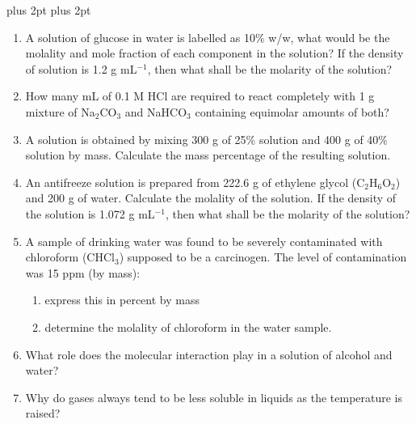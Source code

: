 \documentclass[11pt,a4paper]{article}
\renewcommand{\normalsize}{\fontsize{10.5bp}{12.7bp}\selectfont\abovedisplayskip=4pt plus 2pt\belowdisplayskip=4pt plus 2pt\abovedisplayshortskip=2pt\belowdisplayshortskip=2pt}
\begin{document}
\normalsize


\noindent\hfill\begin{minipage}[t]{0.85\textwidth}
\begin{tcolorbox}[enhanced,frame hidden,colback=white,left=26pt,right=0pt,top=0pt,bottom=8pt,boxsep=0pt,arc=0pt,overlay={\fill[salmon,rounded corners=2pt] (frame.south west) rectangle ([xshift=10pt]frame.north west);}]
\begin{enumerate}[label=\textbf{1.\arabic*},leftmargin=38pt,itemsep=3pt,topsep=0pt,start=5]
\item A solution of glucose in water is labelled as 10\% w/w, what would be the molality and mole fraction of each component in the solution? If the density of solution is 1.2 g mL$^{-1}$, then what shall be the molarity of the solution?
\item How many mL of 0.1 M HCl are required to react completely with 1 g mixture of Na$_2$CO$_3$ and NaHCO$_3$ containing equimolar amounts of both?
\item A solution is obtained by mixing 300 g of 25\% solution and 400 g of 40\% solution by mass. Calculate the mass percentage of the resulting solution.
\item An antifreeze solution is prepared from 222.6 g of ethylene glycol (C$_2$H$_6$O$_2$) and 200 g of water. Calculate the molality of the solution. If the density of the solution is 1.072 g mL$^{-1}$, then what shall be the molarity of the solution?
\item A sample of drinking water was found to be severely contaminated with chloroform (CHCl$_3$) supposed to be a carcinogen. The level of contamination was 15 ppm (by mass):
\begin{enumerate}[label=(\roman*),leftmargin=20pt,itemsep=1pt,topsep=2pt]
\item express this in percent by mass
\item determine the molality of chloroform in the water sample.
\end{enumerate}
\item What role does the molecular interaction play in a solution of alcohol and water?
\item Why do gases always tend to be less soluble in liquids as the temperature is raised?

\end{enumerate}
\end{tcolorbox}
\end{minipage}
\end{document}
